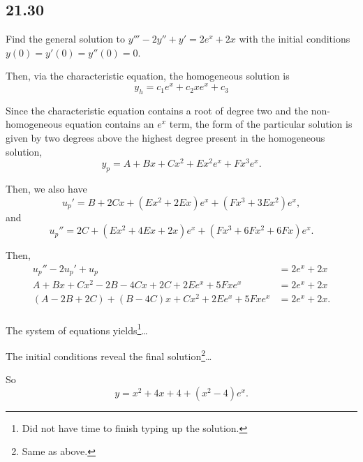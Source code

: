 \documentclass[../hw6]{subfiles}
\begin{document}
\subsection*{21.30}

Find the general solution to $y'''-2y''+y'=2e^x+2x$ with the initial conditions $y(0)=y'(0)=y''(0)=0$.

Then, via the characteristic equation, the homogeneous solution is
\[y_h=c_1e^x+c_2xe^x+c_3\]

Since the characteristic equation contains a root of degree two and the non-homogeneous equation contains an $e^x$ term, the form of the particular solution is given by two degrees above the highest degree present in the homogeneous solution,
\[y_p=A+Bx+Cx^2+Ex^2e^x+Fx^3e^x.\]

Then, we also have
\[u_p'=B+2Cx+(Ex^2+2Ex)e^x+(Fx^3+3Ex^2)e^x,\]
and
\[u_p''=2C+(Ex^2+4Ex+2x)e^x+(Fx^3+6Fx^2+6Fx)e^x.\]

Then, 
\begin{align*}
u_p''-2u_p'+u_p&=2e^x+2x\\
A+Bx+Cx^2-2B-4Cx+2C+2Ee^x+5Fxe^x&=2e^x+2x\\
(A-2B+2C)+(B-4C)x+Cx^2+2Ee^x+5Fxe^x&=2e^x+2x.\\
\end{align*}

The system of equations yields\footnote{Did not have time to finish typing up the solution.}\dots

The initial conditions reveal the final solution\footnote{Same as above.}\dots

So \[y=x^2+4x+4+(x^2-4)e^x.\]
\end{document}
